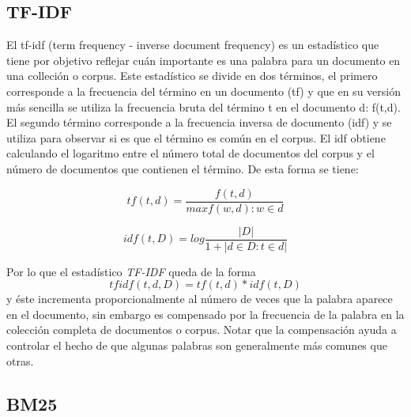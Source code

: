 \subsection{TF-IDF}
\label{marco:tfidf}
El tf-idf (term frequency - inverse document frequency) es un estadístico que tiene por objetivo reflejar cuán importante es una palabra para un documento en una colleción o corpus. Este estadístico se divide en dos términos, el primero corresponde a la frecuencia del término en un documento (tf) y que en su versión más sencilla se utiliza la frecuencia bruta del término t en el documento d: f(t,d). El segundo término corresponde a la frecuencia inversa de documento (idf) y se utiliza para observar si es que el término es común en el corpus. El idf obtiene calculando el logaritmo entre el número total de documentos del corpus y el número de documentos que contienen el término.
De esta forma se tiene:

$$tf(t,d) = \dfrac{f(t,d) }{ max{f(w,d) : w \in d}}$$

$$idf(t,D) = log \frac{ |D| }{1 + |{d \in D : t \in d}|} $$

Por lo que el estadístico \textit{TF-IDF} queda de la forma $$ tfidf(t,d,D) = tf(t,d) * idf(t,D) $$ y éste incrementa proporcionalmente al número de veces que la palabra aparece en el documento, sin embargo es compensado por la frecuencia de la palabra en la colección completa de documentos o corpus. Notar que la compensación ayuda a controlar el hecho de que algunas palabras son generalmente más comunes que otras.





\subsection{BM25}
\label{marco:bm25}